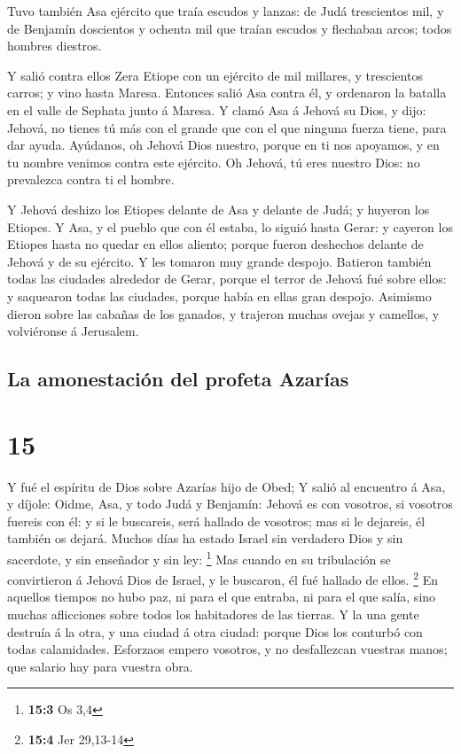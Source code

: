  Tuvo también Asa ejército que traía escudos y lanzas: de
Judá trescientos mil, y de Benjamín doscientos y ochenta mil que traían
escudos y flechaban arcos; todos hombres diestros.

 Y salió contra ellos Zera Etiope con un ejército de mil
millares, y trescientos carros; y vino hasta Maresa. 
Entonces salió Asa contra él, y ordenaron la batalla en el valle de
Sephata junto á Maresa.  Y clamó Asa á Jehová su Dios, y
dijo: Jehová, no tienes tú más con el grande que con el que ninguna
fuerza tiene, para dar ayuda. Ayúdanos, oh Jehová Dios nuestro, porque
en ti nos apoyamos, y en tu nombre venimos contra este ejército. Oh
Jehová, tú eres nuestro Dios: no prevalezca contra ti el hombre.

 Y Jehová deshizo los Etiopes delante de Asa y delante de
Judá; y huyeron los Etiopes.  Y Asa, y el pueblo que con él
estaba, lo siguió hasta Gerar: y cayeron los Etiopes hasta no quedar en
ellos aliento; porque fueron deshechos delante de Jehová y de su
ejército. Y les tomaron muy grande despojo.  Batieron
también todas las ciudades alrededor de Gerar, porque el terror de
Jehová fué sobre ellos: y saquearon todas las ciudades, porque había en
ellas gran despojo.  Asimismo dieron sobre las cabañas de
los ganados, y trajeron muchas ovejas y camellos, y volviéronse á
Jerusalem.

\hypertarget{la-amonestaciuxf3n-del-profeta-azaruxedas}{%
\subsection{La amonestación del profeta
Azarías}\label{la-amonestaciuxf3n-del-profeta-azaruxedas}}

\hypertarget{section-14}{%
\section{15}\label{section-14}}

 Y fué el espíritu de Dios sobre Azarías hijo de Obed;
 Y salió al encuentro á Asa, y díjole: Oidme, Asa, y todo
Judá y Benjamín: Jehová es con vosotros, si vosotros fuereis con él: y
si le buscareis, será hallado de vosotros; mas si le dejareis, él
también os dejará.  Muchos días ha estado Israel sin
verdadero Dios y sin sacerdote, y sin enseñador y sin ley: \footnote{\textbf{15:3}
  Os 3,4}  Mas cuando en su tribulación se convirtieron á
Jehová Dios de Israel, y le buscaron, él fué hallado de ellos.
\footnote{\textbf{15:4} Jer 29,13-14}  En aquellos tiempos
no hubo paz, ni para el que entraba, ni para el que salía, sino muchas
aflicciones sobre todos los habitadores de las tierras.  Y
la una gente destruía á la otra, y una ciudad á otra ciudad: porque Dios
los conturbó con todas calamidades.  Esforzaos empero
vosotros, y no desfallezcan vuestras manos; que salario hay para vuestra
obra.

